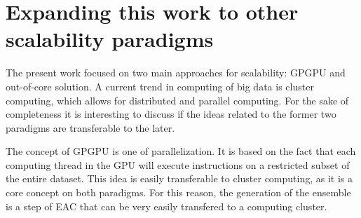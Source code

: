 \section{Expanding this work to other scalability paradigms}
The present work focused on two main approaches for scalability: GPGPU and out-of-core solution. A current trend in computing of big data is cluster computing, which allows for distributed and parallel computing. For the sake of completeness it is interesting to discuss if the ideas related to the former two paradigms are transferable to the later.

The concept of GPGPU is one of parallelization. It is based on the fact that each computing thread in the GPU will execute instructions on a restricted subset of the entire dataset. This idea is easily transferable to cluster computing, as it is a core concept on both paradigms.
For this reason, the generation of the ensemble is a step of EAC that can be very easily transfered to a computing cluster.
